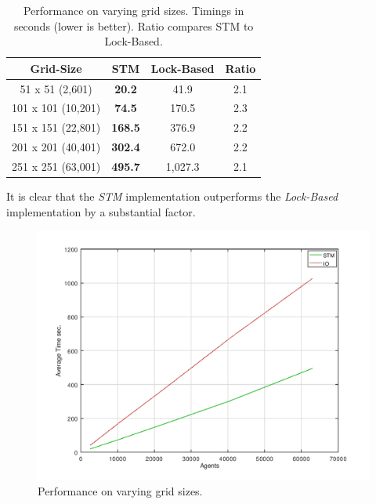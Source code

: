 \begin{table}
	\centering
  	\begin{tabular}{ c || c | c | c }
        Grid-Size          & STM              & Lock-Based   & Ratio \\ \hline \hline 
   		51 x 51 (2,601)    & \textbf{20.2}    & 41.9         & 2.1 \\ \hline
   		101 x 101 (10,201) & \textbf{74.5}    & 170.5        & 2.3 \\ \hline
   		151 x 151 (22,801) & \textbf{168.5}   & 376.9        & 2.2 \\ \hline
   		201 x 201 (40,401) & \textbf{302.4}   & 672.0        & 2.2 \\ \hline
   		251 x 251 (63,001) & \textbf{495.7}   & 1,027.3      & 2.1 \\ \hline \hline
  	\end{tabular}

  	\caption{Performance on varying grid sizes. Timings in seconds (lower is better). Ratio compares STM to Lock-Based.}
	\label{tab:varyinggrid_constcores}
\end{table}

It is clear that the \textit{STM} implementation outperforms the \textit{Lock-Based} implementation by a substantial factor.

\begin{figure}
	\centering
	\includegraphics[width=1\textwidth, angle=0]{./fig/concurrentabs/sir/stm_io_varyinggrid_performance.png}
	\caption{Performance on varying grid sizes.}
	\label{fig:varyinggrid_constcores}
\end{figure}


